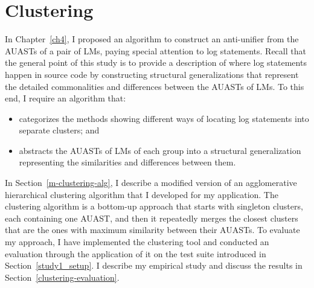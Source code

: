 \chapter{Clustering}  \label{clustering}
In Chapter~\ref{ch4}, I proposed an algorithm to construct an anti-unifier from the AUASTs of a pair of LMs, paying special attention to log statements. Recall that the general point of this study is to provide a description of where log statements happen in source code by constructing structural generalizations that represent the detailed commonalities and differences between the AUASTs of LMs. To this end, I require an algorithm that:
\begin{itemize} [leftmargin=.5in]
\item categorizes the methods showing different ways of locating log statements into separate clusters; and
\item abstracts the AUASTs of LMs of each group into a structural generalization representing the similarities and differences between them.
\end{itemize}

In Section~\ref{m-clustering-alg}, I describe a modified version of an agglomerative hierarchical clustering algorithm that I developed for my application. The clustering algorithm is a bottom-up approach that starts with singleton clusters, each containing one AUAST, and then it repeatedly merges the closest clusters that are the ones with maximum similarity between their AUASTs. To evaluate my approach, I have implemented the clustering tool and conducted an evaluation through the application of it on the test suite introduced in Section~\ref{study1_setup}. I describe my empirical study and discuss the results in Section~\ref{clustering-evaluation}.



